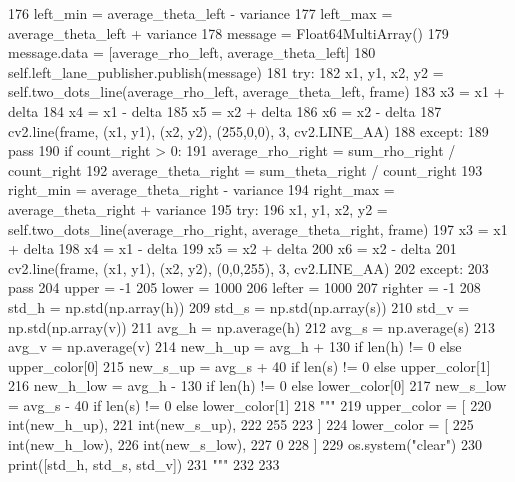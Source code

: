\begin{DoxyCode}
176               left\_min = average\_theta\_left - variance
177               left\_max = average\_theta\_left + variance
178               message = Float64MultiArray()
179               message.data = [average\_rho\_left, average\_theta\_left]
180               self.left\_lane\_publisher.publish(message)
181               \textcolor{keywordflow}{try}:
182                   x1, y1, x2, y2 = self.two\_dots\_line(average\_rho\_left, average\_theta\_left, frame)
183                   x3 = x1 + delta
184                   x4 = x1 - delta
185                   x5 = x2 + delta
186                   x6 = x2 - delta
187                   cv2.line(frame, (x1, y1), (x2, y2), (255,0,0), 3, cv2.LINE\_AA)
188               \textcolor{keywordflow}{except}:
189                   \textcolor{keywordflow}{pass}
190           \textcolor{keywordflow}{if} count\_right > 0:
191               average\_rho\_right = sum\_rho\_right / count\_right
192               average\_theta\_right = sum\_theta\_right / count\_right
193               right\_min = average\_theta\_right - variance
194               right\_max = average\_theta\_right + variance
195               \textcolor{keywordflow}{try}:
196                   x1, y1, x2, y2 = self.two\_dots\_line(average\_rho\_right, average\_theta\_right, frame)
197                   x3 = x1 + delta
198                   x4 = x1 - delta
199                   x5 = x2 + delta
200                   x6 = x2 - delta
201                   cv2.line(frame, (x1, y1), (x2, y2), (0,0,255), 3, cv2.LINE\_AA)
202               \textcolor{keywordflow}{except}:
203                   \textcolor{keywordflow}{pass}
204           upper = -1
205           lower = 1000
206           lefter = 1000
207           righter = -1
208           std\_h = np.std(np.array(h))
209           std\_s = np.std(np.array(s))
210           std\_v = np.std(np.array(v))
211           avg\_h = np.average(h)
212           avg\_s = np.average(s)
213           avg\_v = np.average(v)
214           new\_h\_up = avg\_h + 130 \textcolor{keywordflow}{if} len(h) != 0 \textcolor{keywordflow}{else} upper\_color[0]
215           new\_s\_up = avg\_s + 40 \textcolor{keywordflow}{if} len(s) != 0 \textcolor{keywordflow}{else} upper\_color[1]
216           new\_h\_low = avg\_h - 130 \textcolor{keywordflow}{if} len(h) != 0 \textcolor{keywordflow}{else} lower\_color[0]
217           new\_s\_low = avg\_s - 40 \textcolor{keywordflow}{if} len(s) != 0 \textcolor{keywordflow}{else} lower\_color[1]
218           \textcolor{stringliteral}{"""}
219 \textcolor{stringliteral}{          upper\_color = [}
220 \textcolor{stringliteral}{                  int(new\_h\_up),}
221 \textcolor{stringliteral}{                  int(new\_s\_up),}
222 \textcolor{stringliteral}{                  255}
223 \textcolor{stringliteral}{                  ]}
224 \textcolor{stringliteral}{          lower\_color = [}
225 \textcolor{stringliteral}{                  int(new\_h\_low),}
226 \textcolor{stringliteral}{                  int(new\_s\_low),}
227 \textcolor{stringliteral}{                  0}
228 \textcolor{stringliteral}{                  ]}
229 \textcolor{stringliteral}{          os.system("clear")}
230 \textcolor{stringliteral}{          print([std\_h, std\_s, std\_v])}
231 \textcolor{stringliteral}{          """}
232 
233 
\end{DoxyCode}
